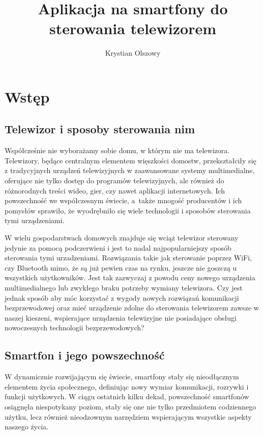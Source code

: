 \documentclass[12pt,twoside]{article}
\author{Krystian Olszowy}
\title{Aplikacja na smartfony do sterowania telewizorem}
\begin{document}
\maketitle

\blankpage

\tableofcontents

\clearpage
\blankpage

\section{Wstęp}
\subsection{Telewizor i sposoby sterowania nim}
Współcześnie nie wyborażamy sobie domu, w którym nie ma telewizora. Telewizory, będące
centralnym elementem więszkości domostw, przekształciły się z tradycyjnych urządzeń
telewizyjnych w zaawansowane systemy multimedialne, oferujące nie tylko dostęp do programów telewizyjnych,
ale również do różnorodnych treści wideo, gier, czy nawet aplikacji internetowych.
Ich powszechność we współczesnym świecie, a~także mnogość producentów i ich pomysłów
sprawiło, że wyodrębniło się wiele technologii i sposobów sterowania tymi urządzeniami.

W wielu gospodarstwach domowych znajduje się wciąż telewizor sterowany jedynie za pomocą podczerwieni i jest
to nadal najpopularniejszy sposób sterowania tymi urzadzeniami. Rozwiązania takie jak sterowanie poprzez WiFi, czy Bluetooth
mimo, że są już pewien czas na rynku, jeszcze nie goszczą u wszystkich użytkowników. Jest tak zazwyczaj z powodu ceny
nowego urządzenia multimedialnego lub zwykłego braku potrzeby wymiany telewizora. Czy jest jednak sposób aby
móc korzystać z wygody nowych rozwiązań komunikacji bezprzewodowej oraz mieć urządzenie zdolne do sterowania
telewizorem zawsze w naszej kieszeni, wspierające urządzenia telewizyjne nie posiadające obsługi nowoczesnych technologii bezprzewodowych?

\subsection{Smartfon i jego powszechność}
W dynamicznie rozwijającym się świecie, smartfony stały się nieodłącznym elementem życia społecznego,
definiując nowy wymiar komunikacji, rozrywki i funkcji użytkowych.
W ciągu ostatnich kilku dekad, powszechność smartfonów osiągnęła niespotykany poziom,
stały się one nie tylko przedmiotem codziennego użytku, lecz również nieodzownym
narzędziem wspierającym wszystkie aspekty naszego życia.
\end{document}

